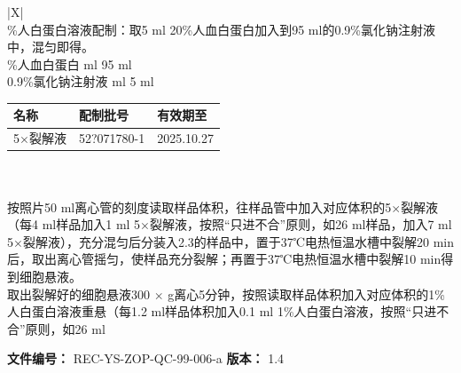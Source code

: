 \documentclass[UTF8,10pt,a4paper,fontset=fandol]{ctexart}
\newcommand{\fieldvalue}[1]{#1}
\newcommand{\handwritten}[1]{#1}
\begin{document}
\begin{center}
\begin{tabularx}{\textwidth}{|X|}
\hline
{}\\
\%人白蛋白溶液配制：取5 ml 20\%人血白蛋白加入到95 ml的0.9\%氯化钠注射液中，混匀即得。\\
\%人血白蛋白 \underline{\hspace{1.2cm}} ml\qquad
\fieldvalue{\handwritten{95}} ml\\
0.9\%氯化钠注射液 \underline{\hspace{1.2cm}} ml\qquad
\fieldvalue{\handwritten{5}} ml\\
\hline
{\begin{tabularx}{\linewidth}{|X|X|X|}
\hline
名称 & 配制批号 & 有效期至\\
\hline
\fieldvalue{5$\times$裂解液} &
\fieldvalue{\handwritten{52?071780-1}} &
\fieldvalue{\handwritten{2025.10.27}}\\
\hline
\end{tabularx}}\\
\hline
{}\\
\hline
按照片50 ml离心管的刻度读取样品体积，往样品管中加入对应体积的5$\times$裂解液（每4 ml样品加入1 ml 5$\times$裂解液，按照“只进不合”原则，如26 ml样品，加入7 ml 5$\times$裂解液），充分混匀后分装入2.3的样品中，置于37℃电热恒温水槽中裂解20 min后，取出离心管摇匀，使样品充分裂解；再置于37℃电热恒温水槽中裂解10 min得到细胞悬液。\\
\hline
取出裂解好的细胞悬液300 $\times$ g离心5分钟，按照读取样品体积加入对应体积的1\%人白蛋白溶液重悬（每1.2 ml样品体积加入0.1 ml 1\%人白蛋白溶液，按照“只进不合”原则，如26 ml\\
\end{tabularx}
\end{center}


\newpage

\noindent
\textbf{文件编号：} REC-YS-ZOP-QC-99-006-a \hfill
\textbf{版本：} 1.4
\end{document}
